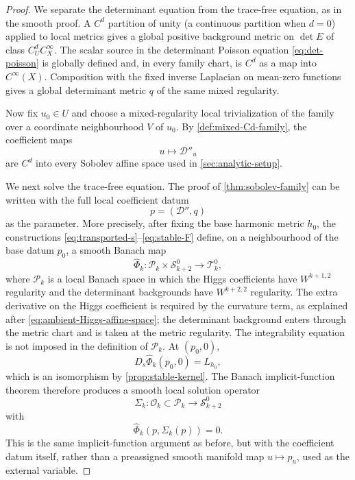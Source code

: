 \documentclass[11pt,reqno]{amsart}
\theoremstyle{definition}
\theoremstyle{remark}
\newcommand{\cD}{\mathcal D}
\newcommand{\cO}{\mathcal O}
\newcommand{\cP}{\mathcal P}
\newcommand{\cS}{\mathcal S}
\newcommand{\cT}{\mathcal T}
\begin{document}
\begin{proof}
We separate the determinant equation from the trace-free equation, as in the smooth proof.  A $C^d$ partition of unity (a continuous partition when $d=0$) applied to local metrics gives a global positive background metric on $\det E$ of class $C^d_UC^\infty_X$.  The scalar source in the determinant Poisson equation \eqref{eq:det-poisson} is globally defined and, in every family chart, is $C^d$ as a map into $C^\infty(X)$.  Composition with the fixed inverse Laplacian on mean-zero functions gives a global determinant metric $q$ of the same mixed regularity.

Now fix $u_0\in U$ and choose a mixed-regularity local trivialization of the family over a coordinate neighbourhood $V$ of $u_0$.  By \cref{def:mixed-Cd-family}, the coefficient maps
\[
  u\longmapsto \cD''_u
\]
are $C^d$ into every Sobolev affine space used in \cref{sec:analytic-setup}.

We next solve the trace-free equation.  The proof of \cref{thm:sobolev-family} can be written with the full local coefficient datum
\[
  p=(\cD'',q)
\]
as the parameter.  More precisely, after fixing the base harmonic metric $h_0$, the constructions \eqref{eq:transported-s}--\eqref{eq:stable-F} define, on a neighbourhood of the base datum $p_0$, a smooth Banach map
\begin{equation}\label{eq:Cd-full-moment-map}
  \widehat\Phi_k:\cP_k\times \cS^0_{k+2}\longrightarrow \cT^0_k,
\end{equation}
where $\cP_k$ is a local Banach space in which the Higgs coefficients
have $W^{k+1,2}$ regularity and the determinant backgrounds have
$W^{k+2,2}$ regularity.  The extra derivative on the Higgs coefficient
is required by the curvature term, as explained after
\eqref{eq:ambient-Higgs-affine-space}; the determinant background enters
through the metric chart and is taken at the metric regularity.  The
integrability equation is not imposed in the definition of $\cP_k$.
At $(p_0,0)$,
\[
  D_s\widehat\Phi_k(p_0,0)=L_{h_0},
\]
which is an isomorphism by \cref{prop:stable-kernel}.  The Banach implicit-function theorem therefore produces a smooth local solution operator
\begin{equation}\label{eq:Cd-solution-operator}
  \Sigma_k:\cO_k\subset\cP_k\longrightarrow \cS^0_{k+2}
\end{equation}
with
\[
  \widehat\Phi_k(p,\Sigma_k(p))=0.
\]
This is the same implicit-function argument as before, but with the coefficient datum itself, rather than a preassigned smooth manifold map $u\mapsto p_u$, used as the external variable.


\end{proof}
\end{document}
